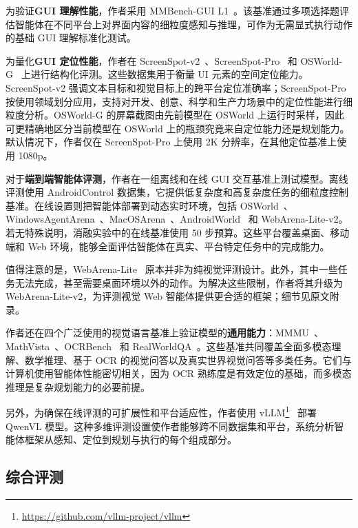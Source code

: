 \documentclass[10pt,twocolumn]{article}
\begin{document}
为验证\textbf{GUI 理解性能}，作者采用 MMBench-GUI L1~\citep{wang2025mmbenchgui}。该基准通过多项选择题评估智能体在不同平台上对界面内容的细粒度感知与推理，可作为无需显式执行动作的基础 GUI 理解标准化测试。

为量化\textbf{GUI 定位性能}，作者在 ScreenSpot-v2~\citep{wu2024osatlas}、ScreenSpot-Pro~\citep{li2025screenspotpro} 和 OSWorld-G~\citep{xie2025scalingcomputerusegroundinguser} 上进行结构化评测。这些数据集用于衡量 UI 元素的空间定位能力。ScreenSpot-v2 强调文本目标和视觉目标上的跨平台定位准确率；ScreenSpot-Pro 按使用领域划分应用，支持对开发、创意、科学和生产力场景中的定位性能进行细粒度分析。OSWorld-G 的屏幕截图由先前模型在 OSWorld 上运行时采样，因此可更精确地区分当前模型在 OSWorld 上的瓶颈究竟来自定位能力还是规划能力。默认情况下，作者仅在 ScreenSpot-Pro 上使用 2K 分辨率，在其他定位基准上使用 1080p。

对于\textbf{端到端智能体评测}，作者在一组离线和在线 GUI 交互基准上测试模型。离线评测使用 AndroidControl 数据集，它提供低复杂度和高复杂度任务的细粒度控制基准。在线设置则把智能体部署到动态实时环境，包括 OSWorld~\citep{xie2024osworld}、WindowsAgentArena~\citep{bonatti2024windows}、MacOSArena~\citep{wang2025mmbenchgui}、AndroidWorld~\citep{rawles2024androidworld} 和 WebArena-Lite-v2。若无特殊说明，消融实验中的在线基准使用 50 步预算。这些平台覆盖桌面、移动端和 Web 环境，能够全面评估智能体在真实、平台特定任务中的完成能力。

值得注意的是，WebArena-Lite~\citep{liu2024visualagentbench} 原本并非为纯视觉评测设计。此外，其中一些任务无法完成，甚至需要桌面环境以外的动作。为解决这些限制，作者将其升级为 WebArena-Lite-v2，为评测视觉 Web 智能体提供更合适的框架；细节见原文附录。

作者还在四个广泛使用的视觉语言基准上验证模型的\textbf{通用能力}：MMMU~\citep{yue2024mmmu}、MathVista~\citep{lu2023mathvista}、OCRBench~\citep{liu2024ocrbench} 和 RealWorldQA~\citep{xai-grok15v-2024}。这些基准共同覆盖全面多模态理解、数学推理、基于 OCR 的视觉问答以及真实世界视觉问答等多类任务。它们与计算机使用智能体性能密切相关，因为 OCR 熟练度是有效定位的基础，而多模态推理是复杂规划能力的必要前提。

另外，为确保在线评测的可扩展性和平台适应性，作者使用 vLLM\footnote{\url{https://github.com/vllm-project/vllm}}~\citep{kwon2023efficient} 部署 QwenVL 模型。这种多维评测设置使作者能够跨不同数据集和平台，系统分析智能体框架从感知、定位到规划与执行的每个组成部分。

\subsection{综合评测}
\end{document}
